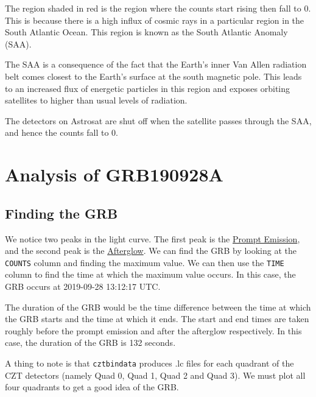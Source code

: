 \documentclass[11pt]{book} %
\begin{document}
The region shaded in red is the region where the counts start rising then fall to 0. This is because there is a high influx of cosmic rays in a particular region in the South Atlantic Ocean. This region is known as the South Atlantic Anomaly (SAA). 

The SAA is a consequence of the fact that the Earth's inner Van Allen radiation belt comes closest to the Earth's surface at the south magnetic pole. This leads to an increased flux of energetic particles in this region and exposes orbiting satellites to higher than usual levels of radiation. 

The detectors on Astrosat are shut off when the satellite passes through the SAA, and hence the counts fall to 0. 

\section{Analysis of GRB190928A}

\subsection{Finding the GRB}

We notice two peaks in the light curve. The first peak is the \href{https://arxiv.org/pdf/1402.7022.pdf}{Prompt Emission}, and the second peak is the \href{https://astronomy.swin.edu.au/cosmos/G/gamma+ray+burst+afterglow}{Afterglow}. We can find the GRB by looking at the \lstinline[language=Python]{COUNTS} column and finding the maximum value. We can then use the \lstinline[language=Python]{TIME} column to find the time at which the maximum value occurs. In this case, the GRB occurs at 2019-09-28 13:12:17 UTC. 

The duration of the GRB would be the time difference between the time at which the GRB starts and the time at which it ends. The start and end times are taken roughly before the prompt emission and after the afterglow respectively. In this case, the duration of the GRB is 132 seconds.

A thing to note is that \lstinline{cztbindata} produces .lc files for each quadrant of the CZT detectors (namely Quad 0, Quad 1, Quad 2 and Quad 3). We must plot all four quadrants to get a good idea of the GRB.
\end{document}
